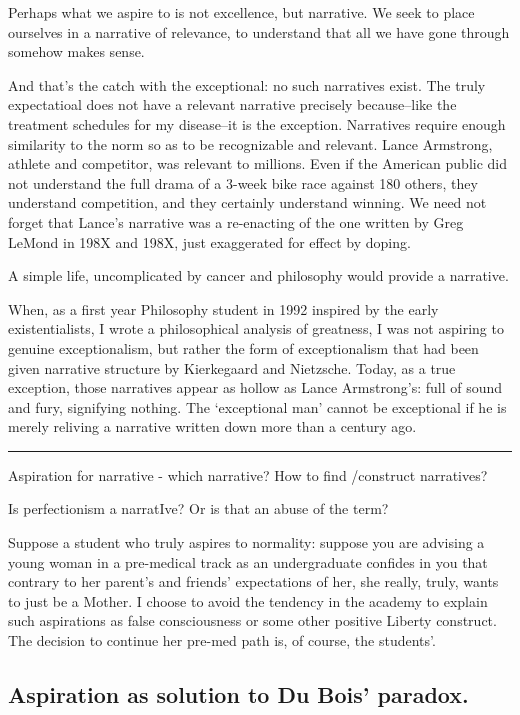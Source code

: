 Perhaps what we aspire to is not excellence, but narrative. We seek to place ourselves in a narrative of relevance, to understand that all we have gone through somehow makes sense. 

And that's the catch with the exceptional: no such narratives exist. The truly expectatioal does not have a relevant narrative precisely because--like the treatment schedules for my disease--it is the exception. Narratives require enough similarity to the norm so as to be recognizable and relevant. Lance Armstrong, athlete and competitor, was relevant to millions. Even if the American public did not understand the full drama of a 3-week bike race against 180 others, they understand competition, and they certainly understand winning. We need not forget that Lance's narrative was a re-enacting of the one written by Greg LeMond in 198X and 198X, just exaggerated for effect by doping.

A simple life, uncomplicated by cancer and philosophy would provide a narrative. 

When, as a first year Philosophy student in 1992 inspired by the early existentialists, I wrote a philosophical analysis of greatness, I was not aspiring to genuine exceptionalism, but rather the form of exceptionalism that had been given narrative structure by Kierkegaard and Nietzsche. Today, as a true exception, those narratives appear as hollow as Lance Armstrong's: full of sound and fury, signifying nothing. The `exceptional man' cannot be exceptional if he is merely reliving a narrative written down more than a century ago. 

\begin{center}\rule{3in}{0.4pt}\end{center}


Aspiration for narrative - which narrative? How to find \slash  construct narratives? 

Is perfectionism a narratIve? Or is that an abuse of the term?

Suppose a student who truly aspires to normality: suppose you are advising a young woman in a pre-medical track as an undergraduate confides in you that contrary to her parent's and friends' expectations of her, she really, truly, wants to just be a Mother. I choose to avoid the tendency in the academy to explain such aspirations as false consciousness or some other positive Liberty construct. The decision to continue her pre-med path is, of course, the students'. 

\subsection{Aspiration as solution to Du Bois' paradox.}
\label{aspirationassolutiontoduboisparadox.}

